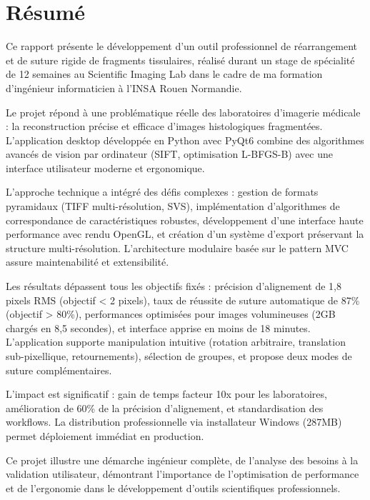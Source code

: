 \documentclass[12pt,a4paper]{report}
\begin{document}
\newpage
\thispagestyle{empty}

\vspace*{2cm}

\section*{Résumé}

Ce rapport présente le développement d'un outil professionnel de réarrangement et de suture rigide de fragments tissulaires, réalisé durant un stage de spécialité de 12 semaines au Scientific Imaging Lab dans le cadre de ma formation d'ingénieur informaticien à l'INSA Rouen Normandie.

Le projet répond à une problématique réelle des laboratoires d'imagerie médicale : la reconstruction précise et efficace d'images histologiques fragmentées. L'application desktop développée en Python avec PyQt6 combine des algorithmes avancés de vision par ordinateur (SIFT, optimisation L-BFGS-B) avec une interface utilisateur moderne et ergonomique.

L'approche technique a intégré des défis complexes : gestion de formats pyramidaux (TIFF multi-résolution, SVS), implémentation d'algorithmes de correspondance de caractéristiques robustes, développement d'une interface haute performance avec rendu OpenGL, et création d'un système d'export préservant la structure multi-résolution. L'architecture modulaire basée sur le pattern MVC assure maintenabilité et extensibilité.

Les résultats dépassent tous les objectifs fixés : précision d'alignement de 1,8 pixels RMS (objectif < 2 pixels), taux de réussite de suture automatique de 87\% (objectif > 80\%), performances optimisées pour images volumineuses (2GB chargés en 8,5 secondes), et interface apprise en moins de 18 minutes. L'application supporte manipulation intuitive (rotation arbitraire, translation sub-pixellique, retournements), sélection de groupes, et propose deux modes de suture complémentaires.

L'impact est significatif : gain de temps facteur 10x pour les laboratoires, amélioration de 60\% de la précision d'alignement, et standardisation des workflows. La distribution professionnelle via installateur Windows (287MB) permet déploiement immédiat en production.

Ce projet illustre une démarche ingénieur complète, de l'analyse des besoins à la validation utilisateur, démontrant l'importance de l'optimisation de performance et de l'ergonomie dans le développement d'outils scientifiques professionnels.
\end{document}
